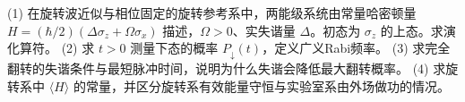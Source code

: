 (1) 在旋转波近似与相位固定的旋转参考系中，两能级系统由常量哈密顿量 \(H=(\hbar/2)(\Delta\sigma_z+\Omega\sigma_x)\) 描述，\(\Omega>0\)、实失谐量 \(\Delta\)。初态为 \(\sigma_z\) 的上态。求演化算符。
(2) 求 \(t>0\) 测量下态的概率 \(P_\downarrow(t)\)，定义广义Rabi频率。
(3) 求完全翻转的失谐条件与最短脉冲时间，说明为什么失谐会降低最大翻转概率。
(4) 求旋转系中 \(\langle H\rangle\) 的常量，并区分旋转系有效能量守恒与实验室系由外场做功的情况。
